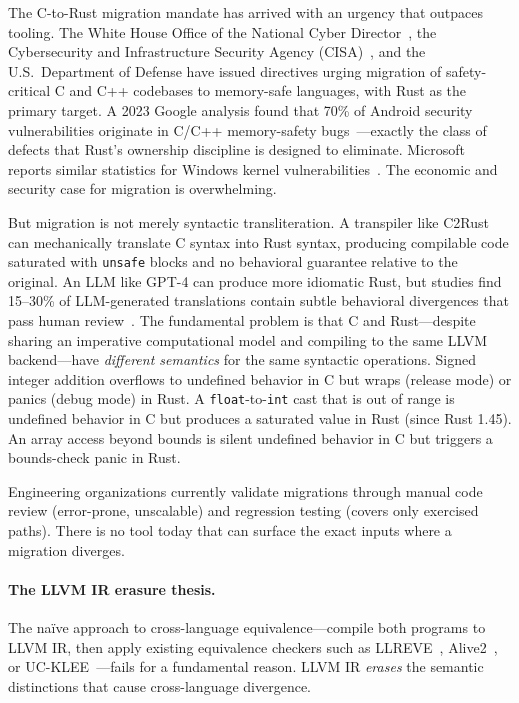 \documentclass[11pt]{article}
\begin{document}
The C-to-Rust migration mandate has arrived with an urgency that outpaces tooling.
The White House Office of the National Cyber Director~\cite{whitehouse2024}, the Cybersecurity and Infrastructure Security Agency (CISA)~\cite{cisa2023}, and the U.S.\ Department of Defense have issued directives urging migration of safety-critical C and C++ codebases to memory-safe languages, with Rust as the primary target.
A 2023 Google analysis found that 70\% of Android security vulnerabilities originate in C/C++ memory-safety bugs~\cite{googlememsafety2023}---exactly the class of defects that Rust's ownership discipline is designed to eliminate.
Microsoft reports similar statistics for Windows kernel vulnerabilities~\cite{msrc2019}.
The economic and security case for migration is overwhelming.

But migration is not merely syntactic transliteration.
A transpiler like C2Rust~\cite{c2rust2019} can mechanically translate C syntax into Rust syntax, producing compilable code saturated with \texttt{unsafe} blocks and no behavioral guarantee relative to the original.
An LLM like GPT-4 can produce more idiomatic Rust, but studies find 15--30\% of LLM-generated translations contain subtle behavioral divergences that pass human review~\cite{pan2024}.
The fundamental problem is that C and Rust---despite sharing an imperative computational model and compiling to the same LLVM backend---have \emph{different semantics} for the same syntactic operations.
Signed integer addition overflows to undefined behavior in C but wraps (release mode) or panics (debug mode) in Rust.
A \texttt{float}-to-\texttt{int} cast that is out of range is undefined behavior in C but produces a saturated value in Rust (since Rust 1.45).
An array access beyond bounds is silent undefined behavior in C but triggers a bounds-check panic in Rust.

Engineering organizations currently validate migrations through manual code review (error-prone, unscalable) and regression testing (covers only exercised paths).
There is no tool today that can surface the exact inputs where a migration diverges.

\paragraph{The LLVM IR erasure thesis.}
The na\"ive approach to cross-language equivalence---compile both programs to LLVM IR, then apply existing equivalence checkers such as LLREVE~\cite{felsing2014}, Alive2~\cite{lopes2021alive2}, or UC-KLEE~\cite{ramos2015}---fails for a fundamental reason.
LLVM IR \emph{erases} the semantic distinctions that cause cross-language divergence.
\end{document}
